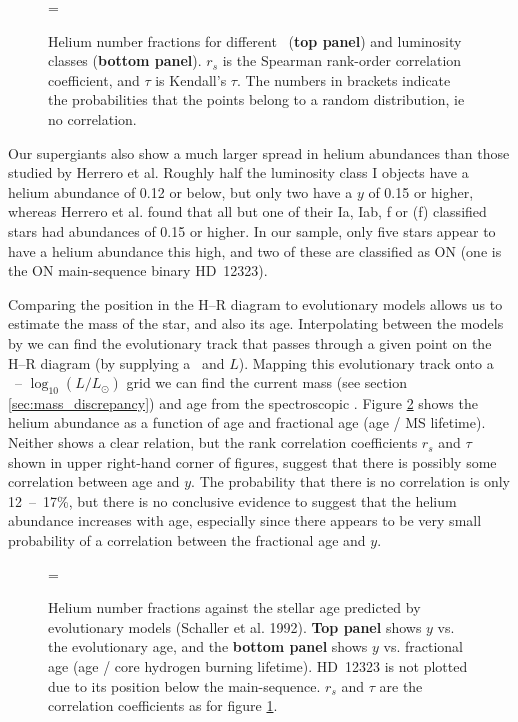\begin{figure} %
\epsfxsize=\figwidth
\setlength{\cen}{(\textwidth / 2) - (\epsfxsize / 2)}
\hspace{\cen}
\caption[Helium fractions for different \logg\ and luminosity classes]
{\fcfont Helium number fractions for different \logg\ (\textbf{top
panel}) and luminosity classes (\textbf{bottom panel}). $r_s$ is the
Spearman rank-order correlation coefficient, and $\tau$ is Kendall's
$\tau$. The numbers in brackets indicate the probabilities that the
points belong to a random distribution, ie no correlation.}
\label{fig:helium:logg}
\end{figure}   %

Our supergiants also show a much larger spread in helium abundances
than those studied by Herrero et al. Roughly half the luminosity class
I objects have a helium abundance of 0.12 or below, but only two have
a $y$ of 0.15 or higher, whereas Herrero et al. found that all but one
of their Ia, Iab, f or (f) classified stars had abundances of 0.15 or
higher. In our sample, only five stars appear to have a helium
abundance this high, and two of these are classified as ON (one is the ON
main-sequence binary HD~12323).

Comparing the position in the H--R diagram to evolutionary models
allows us to estimate the mass of the star, and also its
age. Interpolating between the models by  we can
find the evolutionary track that passes through a given point on the
H--R diagram (by supplying a \teff\ and $L$). Mapping this
evolutionary track onto a \teff\ -- $\log_{10} (L/L_\odot)$ grid we
can find the current mass (see section \ref{sec:mass_discrepancy}) and
age from the spectroscopic \teff. Figure \ref{fig:helium:age} shows
the helium abundance as a function of age and fractional age (age / MS
lifetime). Neither shows a clear relation, but the rank correlation
coefficients $r_s$ and $\tau$ shown in upper right-hand corner of
figures, suggest that there is possibly some correlation
between age and $y$. The probability that there is no correlation is
only 12~--~17\%, but there is no conclusive evidence to suggest that
the helium abundance increases with age, especially since there
appears to be very small probability of a correlation between the
fractional age and $y$.

\begin{figure} %
\epsfxsize=\figwidth
\setlength{\cen}{(\textwidth / 2) - (\epsfxsize / 2)}
\hspace{\cen}
\caption[Helium fractions against stellar age]
{\fcfont Helium number fractions against the stellar age predicted by
evolutionary models (Schaller et al. 1992). \textbf{Top panel} shows
$y$ vs. the evolutionary age, and the \textbf{bottom panel} shows $y$
vs. fractional age (age / core hydrogen burning lifetime). HD~12323 is
not plotted due to its position below the main-sequence. $r_s$ and
$\tau$ are the correlation coefficients as for figure
\ref{fig:helium:logg}.}
\label{fig:helium:age}
\end{figure}   %



